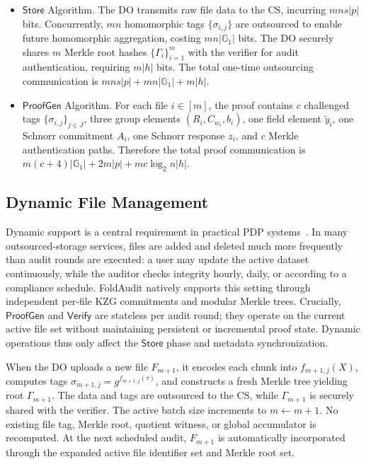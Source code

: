 \documentclass[lettersize,journal]{IEEEtran}
\newcommand{\GG}{\mathbb{G}}
\newcommand{\Store}{\mathsf{Store}}
\newcommand{\ProofGen}{\mathsf{ProofGen}}
\newcommand{\Verify}{\mathsf{Verify}}
\begin{document}
\begin{itemize}
    \item $\Store$ Algorithm. The DO transmits raw file data to the CS, incurring $mns|p|$ bits. Concurrently, $mn$ homomorphic tags $\{\sigma_{i,j}\}$ are outsourced to enable future homomorphic aggregation, costing $mn|\GG_1|$ bits. The DO securely shares $m$ Merkle root hashes $\{\Gamma_i\}_{i=1}^m$ with the verifier for audit authentication, requiring $m|h|$ bits. The total one-time outsourcing communication is $mns|p| + mn|\GG_1| + m|h|$.
    \item $\ProofGen$ Algorithm. For each file $i\in[m]$, the proof contains $c$ challenged tags $\{\sigma_{i,j}\}_{j\in J}$, three group elements $(R_i,C_{w_i},b_i)$, one field element $\tilde{y}_i$, one Schnorr commitment $A_i$, one Schnorr response $z_i$, and $c$ Merkle authentication paths. Therefore the total proof communication is $m(c+4)|\GG_1|+2m|p|+mc\log_2 n|h|.$
    
\end{itemize}






\subsection{Dynamic File Management}
Dynamic support is a central requirement in practical PDP systems~\cite{Erway2009DPDP,Wang2011TPDS,Yang2013TPDS,XuTIFS26}. In many outsourced-storage services, files are added and deleted much more frequently than audit rounds are executed: a user may update the active dataset continuously, while the auditor checks integrity hourly, daily, or according to a compliance schedule. FoldAudit natively supports this setting through independent per-file KZG commitments and modular Merkle trees. Crucially, $\ProofGen$ and $\Verify$ are stateless per audit round; they operate on the current active file set without maintaining persistent or incremental proof state. Dynamic operations thus only affect the $\Store$ phase and metadata synchronization.


When the DO uploads a new file $F_{m+1}$, it encodes each chunk into $f_{m+1,j}(X)$, computes tags $\sigma_{m+1,j}=g^{f_{m+1,j}(\tau)}$, and constructs a fresh Merkle tree yielding root $\Gamma_{m+1}$. The data and tags are outsourced to the CS, while $\Gamma_{m+1}$ is securely shared with the verifier. The active batch size increments to $m \leftarrow m+1$. No existing file tag, Merkle root, quotient witness, or global accumulator is recomputed. At the next scheduled audit, $F_{m+1}$ is automatically incorporated through the expanded active file identifier set and Merkle root set.
\end{document}

